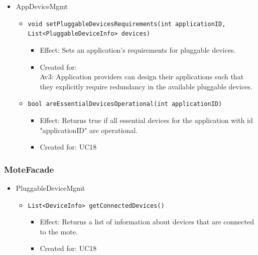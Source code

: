 \begin{itemize}
            \item AppDeviceMgmt
            \begin{itemize}
                \item \texttt{void setPluggableDevicesRequirements(int applicationID, List<PluggableDeviceInfo> devices)}
                \begin{itemize}
                    \item Effect: Sets an application's requirements for pluggable devices.
                    \item Created for: \\
                          Av3: Application providers can design their applications
                          such that they explicitly require redundancy in
                          the available pluggable devices.
                \end{itemize}
                \item \texttt{bool areEssentialDevicesOperational(int applicationID)}
                \begin{itemize}
                    \item Effect: Returns true if all essential devices for the application
                                  with id "applicationID" are operational.
                    \item Created for: UC18
                \end{itemize}
            \end{itemize}
        \end{itemize}

    \subsubsection{MoteFacade}
        \begin{itemize}
            \item PluggableDeviceMgmt
            \begin{itemize}
                \item \texttt{List<DeviceInfo> getConnectedDevices()}
                \begin{itemize}
                    \item Effect: Returns a list of information about devices that are connected to the mote.
                    \item Created for: UC18
                \end{itemize}
            \end{itemize}
        \end{itemize}

